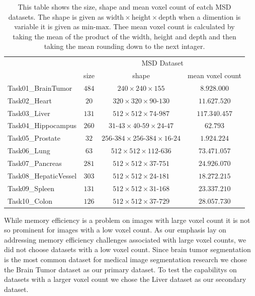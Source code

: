 \begin{table}[ht!]
\begin{center} {\footnotesize
\begin{tabular}{lccc}
\hline
	& \multicolumn{3}{c}{MSD Dataset}  \\
	& \multicolumn{1}{c}{size} & \multicolumn{1}{c}{shape} & \multicolumn{1}{c}{mean voxel count}\\
\hline
Task01\_BrainTumor & $484$ & $240\times240\times155$ & $8.928.000$ \\[1ex]
Task02\_Heart & $20$ & $320\times320\times90\mbox{-}130$ & $11.627.520$ \\[1ex]
Task03\_Liver & $131$ & $512\times512\times74\mbox{-}987$ & $117.340.457$ \\[1ex]
Task04\_Hippocampus & $260$ & $31\mbox{-}43\times40\mbox{-}59\times24\mbox{-}47$ & $62.793$ \\[1ex]
Task05\_Prostate & $32$ & $256\mbox{-}384\times256\mbox{-}384\times16\mbox{-}24$ & $1.924.224$ \\[1ex]
Task06\_Lung & $63$ & $512\times512\times112\mbox{-}636$ & $73.471.057$ \\[1ex]
Task07\_Pancreas & $281$ & $512\times512\times37\mbox{-}751$ & $24.926.070$ \\[1ex]
Task08\_HepaticVessel & $303$ & $512\times512\times24\mbox{-}181$ & $18.272.215$ \\[1ex]
Task09\_Spleen & $131$ & $512\times512\times31\mbox{-}168$ & $23.337.210$ \\[1ex]
Task10\_Colon & $126$ & $512\times512\times37\mbox{-}729$ & $28.057.730$ \\[1ex]
\hline
\end{tabular} }
\end{center}
\caption{\footnotesize This table shows the size, shape and mean voxel count of eatch MSD datasets.
The shape is given as $\text{width}\times \text{height}\times \text{depth}$ when a dimention is variable it is given as $\text{min}\mbox{-}\text{max}$.
Thee mean voxel count is calculated by taking the mean of the product of the width, height and depth and then taking the mean rounding down to the next intager.}
\label{turns}
\end{table}
\noindent While memory efficiency is a problem on images with large voxel count it is not so prominent for images with a low voxel count.
As our emphasis lay on addressing memory efficiency challenges associated with large voxel counts, we did not choose datasets with a low voxel count.
Since brain tumor segmentation is the most common dataset for medical image segmentation research we chose the Brain Tumor dataset as our primary dataset.
To test the capabilitys on datasets with a larger voxel count we chose the Liver dataset as our secondary dataset.\\

